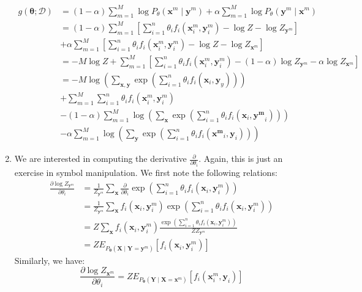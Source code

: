 \documentclass[12pt]{article}
\newcommand{\vect}[1]{\boldsymbol{#1}}
\begin{document}
\begin{enumerate}[label=(\alph*)]
  \begin{align*}
  	g(\vect{\theta}; \mathcal{D}) &= (1- \alpha)\sum_{m=1}^M \log P_{\theta}(\vect{x}^m \mid \vect{y}^m)  + \alpha \sum_{m=1}^M  \log P_{\theta}(\vect{y}^m \mid \vect{x}^m) \\
  	&= (1- \alpha)\sum_{m=1}^M \left[\sum_{i=1}^n \theta_i f_i (\vect{x}_i^m, \vect{y}_i^m) - \log Z - \log Z_{\vect{y}^m}\right]  \\
  	&+ \alpha \sum_{m=1}^M \left[\sum_{i=1}^n \theta_i f_i (\vect{x}_i^m, \vect{y}_i^m) - \log Z - \log Z_{\vect{x}^m}\right] \\
  	&= -M\log Z  + \sum_{m=1}^M \left[\sum_{i=1}^n \theta_i f_i(\vect{x}_i^m, \vect{y}_i^m) - (1-\alpha) \log Z_{\vect{y}^m} - \alpha \log Z_{\vect{x}^m} \right] \\
  	&= -M \log \left(\sum_{\vect{x}, \vect{y}} \exp\left(\sum_{i=1}^n \theta_i f_i(\vect{x}_i, \vect{y}_y)\right) \right) \\
  	&+ \sum_{m=1}^M \sum_{i=1}^n \theta_i f_i(\vect{x}_i^m, \vect{y}_i^m) \\
  	&- (1-\alpha) \sum_{m=1}^M \log \left(\sum_{\vect{x}} \exp\left(\sum_{i =1}^n \theta_i f_i(\vect{x}_i, \vect{y^m}_i)\right)\right) \\
  	&- \alpha \sum_{m=1}^M \log \left(\sum_{\vect{y}} \exp\left(\sum_{i =1}^n \theta_i f_i(\vect{x^m}_i, \vect{y}_i)\right) \right)
  \end{align*}
  \item We are interested in computing the derivative $\frac{\partial}{\partial \theta_i}$. Again, this is just an exercise in symbol manipulation. We first note the following relations:
  \begin{align*}
  	\frac{\partial \log Z_{\vect{y}^m}}{\partial \theta_i} &= \frac{1}{Z_{\vect{y}^m}} \sum_{\vect{x}} \frac{\partial}{\partial \theta_i} \exp\left(\sum_{i =1}^n \theta_i f_i(\vect{x}_i, \vect{y}^m_i)\right) \\
  	&= \frac{1}{Z_{\vect{y}^m}} \sum_{\vect{x}} f_i(\vect{x}_i, \vect{y}_i^m) \exp\left(\sum_{i =1}^n \theta_i f_i(\vect{x}_i, \vect{y}^m_i)\right)  \\
  	&= Z \sum_{\vect{x}} f_i(\vect{x}_i, \vect{y}_i^m) \frac{\exp\left(\sum_{i =1}^n \theta_i f_i(\vect{x}_i, \vect{y}^m_i)\right) }{Z Z_{\vect{y}^m}} \\
  	&= ZE_{P_{\vect{\theta}}(\vect{X} \mid \vect{Y} = \vect{y}^{m})}[f_i(\vect{x}_i, \vect{y}_i^m)]
  \end{align*}
  Similarly, we have:
  $$
  	\frac{\partial\log Z_{\vect{x}^m}}{\partial \theta_i}  = ZE_{P_{\vect{\theta}}(\vect{Y} \mid \vect{X} = \vect{x}^{m})}[f_i(\vect{x}_i^m, \vect{y}_i)]
$$
\end{enumerate}
\end{document}
